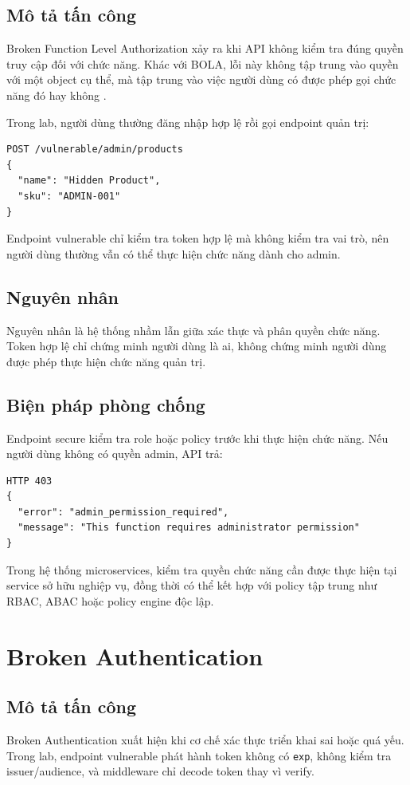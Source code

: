 \documentclass[14pt,a4paper]{extreport}
\begin{document}
\subsection{Mô tả tấn công}
Broken Function Level Authorization xảy ra khi API không kiểm tra đúng quyền truy cập đối với chức năng. Khác với BOLA, lỗi này không tập trung vào quyền với một object cụ thể, mà tập trung vào việc người dùng có được phép gọi chức năng đó hay không \cite{owaspbfla}.

Trong lab, người dùng thường đăng nhập hợp lệ rồi gọi endpoint quản trị:
\begin{lstlisting}
POST /vulnerable/admin/products
{
  "name": "Hidden Product",
  "sku": "ADMIN-001"
}
\end{lstlisting}

Endpoint vulnerable chỉ kiểm tra token hợp lệ mà không kiểm tra vai trò, nên người dùng thường vẫn có thể thực hiện chức năng dành cho admin.

\subsection{Nguyên nhân}
Nguyên nhân là hệ thống nhầm lẫn giữa xác thực và phân quyền chức năng. Token hợp lệ chỉ chứng minh người dùng là ai, không chứng minh người dùng được phép thực hiện chức năng quản trị.

\subsection{Biện pháp phòng chống}
Endpoint secure kiểm tra role hoặc policy trước khi thực hiện chức năng. Nếu người dùng không có quyền admin, API trả:
\begin{lstlisting}
HTTP 403
{
  "error": "admin_permission_required",
  "message": "This function requires administrator permission"
}
\end{lstlisting}

Trong hệ thống microservices, kiểm tra quyền chức năng cần được thực hiện tại service sở hữu nghiệp vụ, đồng thời có thể kết hợp với policy tập trung như RBAC, ABAC hoặc policy engine độc lập.

\section{Broken Authentication}
\subsection{Mô tả tấn công}
Broken Authentication xuất hiện khi cơ chế xác thực triển khai sai hoặc quá yếu. Trong lab, endpoint vulnerable phát hành token không có \texttt{exp}, không kiểm tra issuer/audience, và middleware chỉ decode token thay vì verify.
\end{document}

